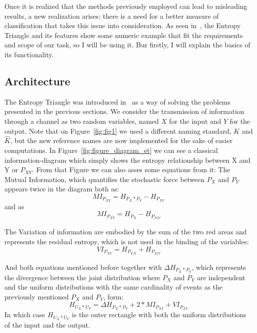 Once it is realized that the methods previously employed can lead to misleading results, a new realization arises: there is a need for a better measure of classification that takes this issue into consideration. As seen in~\cite{val:pel:14a}, the Entropy Triangle and its features show some numeric example that fit the requirements and scope of our task, so I will be using it. Bur firstly, I will explain the basics of its functionality.\par

\subsection{Architecture}

The Entropy Triangle was introduced in~\cite{val:pel:10b} as a way of solving the problems presented in the previous sections. We consider the transmission of information through a channel as two random variables, named $X$ for the input and $Y$ for the output. Note that on Figure~\ref{fig:fig1} we used a different naming standard, $K$ and $\hat{K}$, but the new reference names are now implemented for the sake of easier computations. In Figure~\ref{fig:figure_diagram_et} we can see a classical information-diagram which simply shows the entropy relationship between X and Y or $P_{XY}$. From that Figure we can also asses some equations from it: 
%
The Mutual Information, which quantifies the stochastic force between $P_X$ and $P_Y$ appears twice in the diagram both as:
\begin{equation}\label{eq:mutual_information_1}
MI_{P_{XY}} = H_{P_X * P_Y} - H_{P_{XY}}
\end{equation}
and as 
\begin{equation}\label{eq:mutual_information_2}
MI_{P_{XY}} = H_{P_X} - H_{P_{X|Y}}
\end{equation}

The Variation of information are embodied by the sum of the two red areas and represents the residual entropy, which is not used in the binding of the variables:
% 
\begin{equation}\label{eq:virtual_information}
VI_{P_{XY}} = H_{P_{Y|X}} + H_{P_{X|Y}}
\end{equation}

And both equations mentioned before together with $\Delta H_{P_{X} * P_{Y}}$, which represents the divergence between the joint distribution where $P_X$ and $P_Y$ are independent and the uniform distributions with the same cardinality of events as the previously mentioned $P_X$ and $P_Y$, form:
%
\begin{equation}\label{eq:uniform_entropy_x_y}
H_{U_{X} * U_{Y}} = \Delta H_{P_{X} * P_{Y}} + 2 * MI_{P_{XY}} + VI_{P_{XY}}
\end{equation}
%
In which case $H_{U_{X} * U_{Y}}$ is the outer rectangle with both the uniform distributions of the input and the output.

